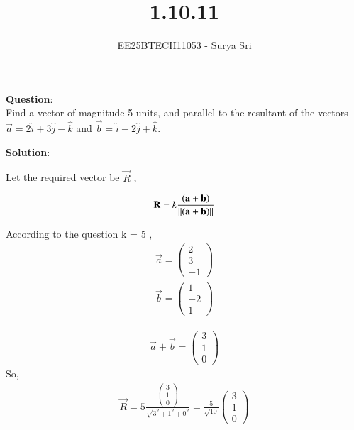 \documentclass[journal]{IEEEtran}
\begin{document}

\vspace{3cm}

\title{1.10.11}
\author{EE25BTECH11053 - Surya Sri}
{\let\newpage\relax\maketitle}

\renewcommand{\thefigure}{\theenumi}
\renewcommand{\thetable}{\theenumi}
\setlength{\intextsep}{10pt} %

\textbf{Question}:\\
Find a vector of magnitude 5 units, and parallel to the resultant of the vectors $\vec{a} = 2\hat{i} + 3\hat{j} - \hat{k}$ and $\vec{b} = \hat{i} - 2\hat{j} + \hat{k}$.


\bigskip
\textbf{Solution}:



Let the required vector be $\vec{R}$ ,

\begin{align}
    \mathbf{R} = k \frac{(\mathbf{a} + \mathbf{b})}{\left\lVert(\mathbf{a} + \mathbf{b})\right\rVert}
\end{align}

  According to the question k = 5 ,
\begin{align}
     \vec{a} = \begin{pmatrix} 2 \\ 3 \\ -1 \end{pmatrix} 
 \end{align}
 \begin{align}
 \vec{b} = \begin{pmatrix} 1 \\ -2 \\ 1 \end{pmatrix} 
 \end{align}

\begin{align}
\vec{a} + \vec{b} = \begin{pmatrix} 3 \\ 1 \\ 0 \end{pmatrix}
\end{align}
So,
\begin{align}
\vec{R} = 5 \frac{\begin{pmatrix} 3 \\ 1 \\ 0 \end{pmatrix}}{\sqrt{3^2 + 1^2 + 0^2}} = \frac{5}{\sqrt{10}} \begin{pmatrix} 3 \\ 1 \\ 0 \end{pmatrix}
\end{align}
\end{document}
